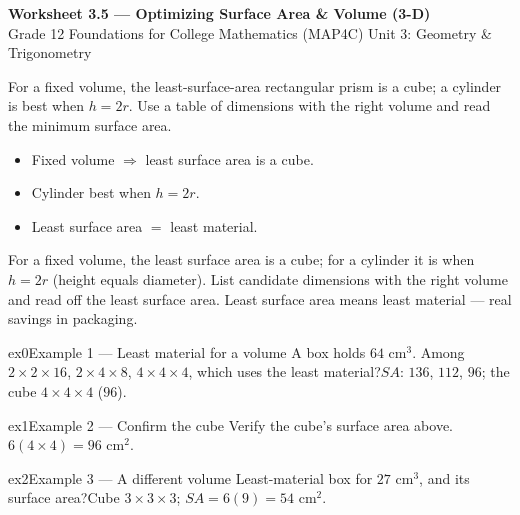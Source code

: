 \documentclass[11pt]{article}
\begin{document}
\begin{center}
{\LARGE\bfseries\color{titleblue}Worksheet 3.5 --- Optimizing Surface Area \& Volume (3-D)}\\[2pt]
{\small Grade 12 Foundations for College Mathematics (MAP4C) \textperiodcentered{} Unit 3: Geometry \& Trigonometry}
\end{center}

\begin{ideabox}
For a fixed volume, the least-surface-area rectangular prism is a cube; a cylinder is best when $h=2r$. Use a table of dimensions with the right volume and read the minimum surface area.
\begin{itemize}[leftmargin=*,itemsep=2pt]
  \item Fixed volume $\Rightarrow$ least surface area is a cube.
  \item Cylinder best when $h=2r$.
  \item Least surface area $=$ least material.
\end{itemize}
\end{ideabox}

\begin{learnbox}
For a fixed volume, the least surface area is a cube; for a cylinder it is when $h=2r$ (height equals diameter).
List candidate dimensions with the right volume and read off the least surface area.
Least surface area means least material — real savings in packaging.
\end{learnbox}


\begin{example}{ex0}{Example 1 --- Least material for a volume}
A box holds $64$ cm$^3$. Among $2\times2\times16$, $2\times4\times8$, $4\times4\times4$, which uses the least material?\soln $SA$: $136$, $112$, $96$; the cube $4\times4\times4$ ($96$).
\end{example}

\begin{example}{ex1}{Example 2 --- Confirm the cube}
Verify the cube's surface area above.\soln $6(4\times4)=96$ cm$^2$.
\end{example}

\begin{example}{ex2}{Example 3 --- A different volume}
Least-material box for $27$ cm$^3$, and its surface area?\soln Cube $3\times3\times3$; $SA=6(9)=54$ cm$^2$.
\end{example}
\end{document}
